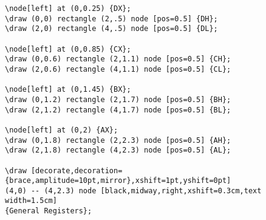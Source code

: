\begin{note}
\begin{center}
\begin{lstlisting}[language={[LaTeX]TeX},basicstyle=\ttfamily]
\node[left] at (0,0.25) {DX};
\draw (0,0) rectangle (2,.5) node [pos=0.5] {DH};
\draw (2,0) rectangle (4,.5) node [pos=0.5] {DL};

\node[left] at (0,0.85) {CX};
\draw (0,0.6) rectangle (2,1.1) node [pos=0.5] {CH};
\draw (2,0.6) rectangle (4,1.1) node [pos=0.5] {CL};

\node[left] at (0,1.45) {BX};
\draw (0,1.2) rectangle (2,1.7) node [pos=0.5] {BH};
\draw (2,1.2) rectangle (4,1.7) node [pos=0.5] {BL};

\node[left] at (0,2) {AX};
\draw (0,1.8) rectangle (2,2.3) node [pos=0.5] {AH};
\draw (2,1.8) rectangle (4,2.3) node [pos=0.5] {AL};

\draw [decorate,decoration={brace,amplitude=10pt,mirror},xshift=1pt,yshift=0pt]
(4,0) -- (4,2.3) node [black,midway,right,xshift=0.3cm,text width=1.5cm] 
{General Registers};
\end{lstlisting}
\end{center}
\end{note}

